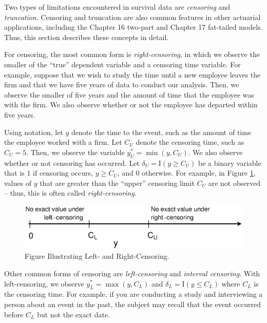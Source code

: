 Two types of limitations encountered in survival data are
\emph{censoring} and \emph{truncation}. Censoring and truncation are
also common features in other actuarial applications, including the
Chapter 16 two-part and Chapter 17 fat-tailed models. Thus, this
section describes these concepts in detail.

For censoring, the most common form is \emph{right-censoring}, in
which we observe the smaller of the ``true'' dependent variable and
a censoring time variable. For example, suppose that we wish to
study the time until a new employee leaves the firm and that we have
five years of data to conduct our analysis. Then, we observe the
smaller of five years and the amount of time that the employee was
with the firm. We also observe whether or not the employee has
departed within five years.

Using notation, let $y$ denote the time to the event, such as the
amount of time the employee worked with a firm. Let $C_U$ denote the
censoring time, such as $C_U=5$. Then, we observe the variable
$y_U^{\ast}= \min(y, C_U)$. We also observe whether or not censoring
has occurred. Let  $\delta_U= \mathrm{I}(y \geq C_U)$ be a binary
variable that is 1 if censoring occurs, $y \geq C_U$, and 0
otherwise. For example, in Figure \ref{F14:Censoring}, values of $y$
that are greater than the ``upper'' censoring limit $C_U$ are not
observed -- thus, this is often called \emph{right-censoring}.


\begin{figure}[htp]
  \begin{center}
    \includegraphics[width=.8\textwidth]{Chapter14Survival/F14CensoringA.eps}
    \caption{\label{F14:Censoring}\small Figure Illustrating Left- and Right-Censoring.}
  \end{center}
\end{figure}


Other common forms of censoring are \textit{left-censoring} and
\textit{interval censoring}. With left-censoring, we observe
$y_L^{\ast}= \max(y, C_L)$ and $\delta_L= \mathrm{I}(y \leq C_L)$
where $C_L$ is the censoring time. For example, if you are
conducting a study and interviewing a person about an event in the
past, the subject may recall that the event occurred before $C_L$
but not the exact
date.

